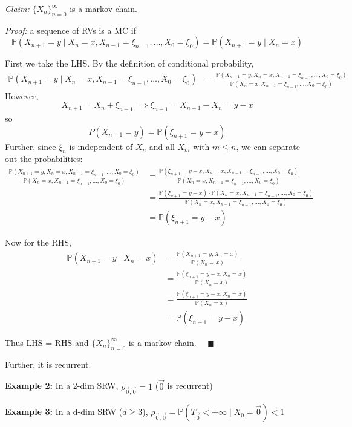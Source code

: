 \documentclass[12pt]{article}
\renewcommand{\P}{\mathbb{P}}
\newcommand{\qed}{\quad \blacksquare}
\begin{document}
\emph{Claim:} $\{X_n\}_{n=0}^\infty$ is a markov chain. 

\emph{Proof:} a sequence of RVs is a MC if 
\[\P(X_{n+1} = y \; | \; X_n = x, X_{n-1} = \xi_{n-1}, \dots, X_0 = \xi_0) = \P(X_{n+1}= y\; | \; X_n = x)\]

First we take the LHS. By the definition of conditional probability, 
\begin{align*}
    \P(X_{n+1} = y \; | \; X_n = x, X_{n-1} = \xi_{n-1}, \dots, X_0 = \xi_0) &= \frac{\P(X_{n+1} = y, X_n = x, X_{n-1} = \xi_{n-1}, \dots, X_0 = \xi_0)}{\P(X_n = x, X_{n-1} = \xi_{n-1}, \dots, X_0 = \xi_0)}
\end{align*}
However, 
\[X_{n+1} = X_n + \xi_{n+1} \implies \xi_{n+1} = X_{n+1} - X_n = y - x\]
so 
\[P(X_{n+1} = y) = \P(\xi_{n+1} = y - x)\]
Further, since $\xi_n$ is independent of $X_n$ and all $X_m$ with $m \leq n$, we can separate out the probabilities:
\begin{align*}
    \frac{\P(X_{n+1} = y, X_n = x, X_{n-1} = \xi_{n-1}, \dots, X_0 = \xi_0)}{\P(X_n = x, X_{n-1} = \xi_{n-1}, \dots, X_0 = \xi_0)} &= \frac{\P(\xi_{n+1} = y -x, X_n = x, X_{n-1} = \xi_{n-1}, \dots, X_0 = \xi_0)}{\P(X_n = x, X_{n-1} = \xi_{n-1}, \dots, X_0 = \xi_0)}\\
    &= \frac{\P(\xi_{n+1} = y-x) \cdot \P(X_n = x, X_{n-1} = \xi_{n-1}, \dots, X_0 = \xi_0)}{\P(X_n = x, X_{n-1} = \xi_{n-1}, \dots, X_0 = \xi_0)} \\
    &= \P(\xi_{n+1} = y-x)
\end{align*}

Now for the RHS, 
\begin{align*}
    \P(X_{n+1} = y \; | \; X_n = x) &= \frac{\P(X_{n+1} = y, X_n = x)}{\P(X_n = x)}\\
    &= \frac{\P(\xi_{n+1} = y -x, X_n = x)}{\P(X_n = x)}\\
    &= \frac{\P(\xi_{n+1} = y -x, X_n = x)}{\P(X_n = x)}\\
    &= \P(\xi_{n+1} = y -x)
\end{align*}

Thus LHS = RHS and $\{X_n\}_{n=0}^\infty$ is a markov chain. $\qed$

Further, it is recurrent. 

\textbf{Example 2:} In a 2-dim SRW, $\rho_{\vec 0, \vec 0 } = 1$ ($\vec 0$ is recurrent)

\textbf{Example 3:} In a d-dim SRW ($d \geq 3$), $\rho_{\vec 0, \vec 0} = \P(T_{\vec 0} < +\infty \; | \; X_0 = \vec 0) < 1$ 
\end{document}
